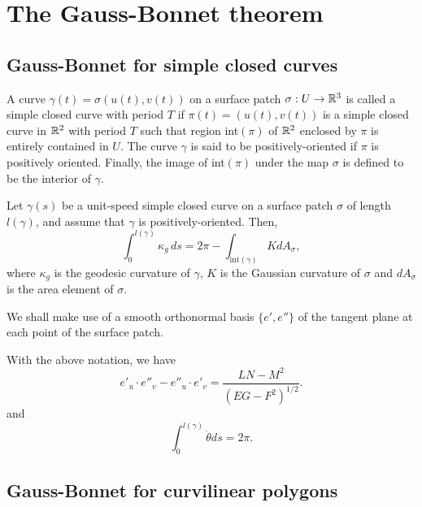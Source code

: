 \section{The Gauss-Bonnet theorem}

\subsection{Gauss-Bonnet for simple closed curves}

\begin{defn}
  A curve $\gamma(t) = \sigma(u(t), v(t))$ on a surface patch $\sigma: U \to \mathbb{R}^3$ is called
  a simple closed curve with period $T$ if $\pi(t) = (u(t), v(t))$ is a simple closed curve in
  $\mathbb{R}^2$ with period $T$ such that region int$(\pi)$ of $\mathbb{R}^2$ enclosed by $\pi$ is
  entirely contained in $U$.
  The curve $\gamma$ is said to be positively-oriented if $\pi$ is positively oriented.
  Finally, the image of int$(\pi)$ under the map $\sigma$ is defined to be the interior of $\gamma$.
\end{defn}

\begin{theorem}
  Let $\gamma(s)$ be a unit-speed simple closed curve on a surface patch $\sigma$ of length $l(\gamma)$,
  and assume that $\gamma$ is positively-oriented. Then,
  \[
    \int_0^{l(\gamma)} \kappa_g \, ds = 2\pi - \int_{\text{int}(\gamma)} K dA_{\sigma},
  \]
  where $\kappa_g$ is the geodesic curvature of $\gamma$,
  $K$ is the Gaussian curvature of $\sigma$ and
  $dA_{\sigma}$ is the area element of $\sigma$.
\end{theorem}

We shall make use of a smooth orthonormal basis $\{e', e''\}$ of the tangent plane at each point of the surface patch.

\begin{lemma}
  With the above notation, we have
  \[
    e'_u \cdot  e''_v - e''_u \cdot e'_v = \frac{LN - M^2}{(EG - F^2)^{1 / 2}}.
  \]
  and
  \[
    \int_0^{l(\gamma)} \dot{\theta} ds = 2\pi.
  \]
\end{lemma}

\subsection{Gauss-Bonnet for curvilinear polygons}

